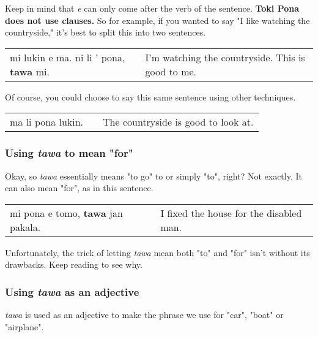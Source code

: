 Keep in mind that \textit{e} can only come after the verb of the sentence. 
\textbf{Toki Pona does not use clauses.} 
So for example, if you wanted to say "I like watching the countryside," it's best to split this into two sentences.

\begin{supertabular}{p{5,5cm}|ll}
mi lukin e ma. ni li ' pona, \textbf{tawa} mi. && I'm watching the countryside. This is good to me.\\
\end{supertabular} 

Of course, you could choose to say this same sentence using other techniques. 

\begin{supertabular}{p{5,5cm}|ll}
ma li pona lukin. && The countryside is good to look at. \\
\end{supertabular} 

\subsubsection*{Using \textit{tawa} to mean "for"}
%
Okay, so \textit{tawa} essentially means "to go" to or simply "to", right? 
Not exactly. 
It can also mean "for", as in this sentence.
 
\begin{supertabular}{p{5,5cm}|ll}
mi pona e tomo, \textbf{tawa} jan pakala. && I fixed the house for the disabled man. \\
\end{supertabular} 

Unfortunately, the trick of letting \textit{tawa} mean both "to" and "for" isn't without its drawbacks. 
Keep reading to see why. 

\subsubsection*{Using \textit{tawa} as an adjective}
%
\textit{tawa} is used as an adjective to make the phrase we use for "car", "boat" or "airplane".

